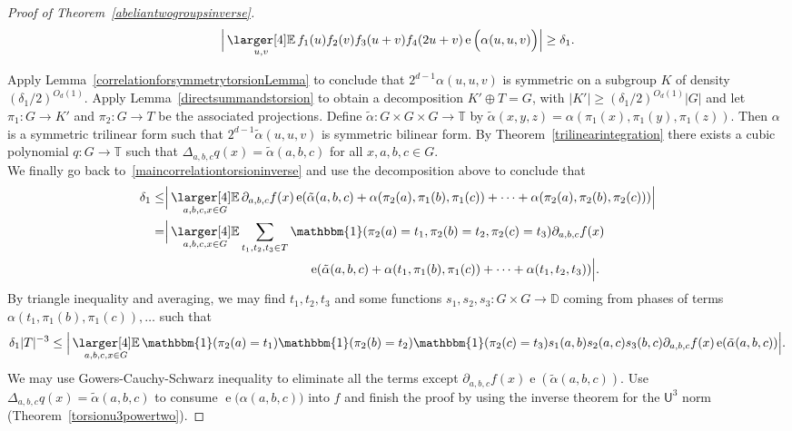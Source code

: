 \documentclass[a4paper,11pt]{article}
\numberwithin{theorem}{section}
\theoremstyle{definition}
\newcommand\id{\mathbbm{1}}
\newcommand{\on}[1]{
	\operatorname{#1}
}
\newcommand{\exx}{
  \mathop{
    \mathchoice{\vcenter{\hbox{\larger[4]$\mathbb{E}$}}}
               {\kern0pt\mathbb{E}}
               {\kern0pt\mathbb{E}}
               {\kern0pt\mathbb{E}}
  }\displaylimits
}
\begin{document}
\begin{proof}[Proof of Theorem~\ref{abeliantwogroupsinverse}]
    \begin{equation}\Big|\exx_{u , v} f_1(u) f_2(v) f_3(u + v) f_4(2u + v) \on{e}\Big(\alpha(u,u, v)\Big)\Big| \geq \delta_1.\label{firstCorrelationComplexityDecTorsion}\end{equation}

    Apply Lemma~\ref{correlationforsymmetrytorsionLemma} to conclude that $2^{d-1}\alpha(u,u, v)$ is symmetric on a subgroup $K$ of density $(\delta_1/2)^{O_d(1)}$. Apply Lemma~\ref{directsummandstorsion} to obtain a decomposition $K' \oplus T = G$, with $|K'| \geq (\delta_1/2)^{O_d(1)}|G|$ and let $\pi_1 : G \to K'$ and $\pi_2 : G \to T$ be the associated projections. Define $\tilde{\alpha} :G \times G \times G \to \mathbb{T}$ by $\tilde{\alpha}(x,y,z) = \alpha(\pi_1(x), \pi_1(y), \pi_1(z))$. Then $\alpha$ is a symmetric trilinear form such that $2^{d-1}\tilde{\alpha}(u,u,v)$ is symmetric bilinear form. By Theorem~\ref{trilinearintegration} there exists a cubic polynomial $q :G \to \mathbb{T}$ such that $\Delta_{a,b,c}q(x) = \tilde{\alpha}(a,b,c)$ for all $x,a,b,c \in G$.\\
    We finally go back to~\eqref{maincorrelationtorsioninverse} and use the decomposition above to conclude that 
    \begin{align*}\delta_1 \leq & \Big|\exx_{a,b,c,x \in G} \partial_{a,b,c} f(x) \on{e}(\tilde{\alpha}(a,b,c) + \alpha(\pi_2(a), \pi_1(b), \pi_1(c)) + \dots + \alpha(\pi_2(a), \pi_2(b), \pi_2(c)))\Big|\\
    = & \Big|\exx_{a,b,c,x \in G} \sum_{t_1, t_2, t_3 \in T} \id(\pi_2(a) = t_1, \pi_2(b) = t_2, \pi_2(c) = t_3) \partial_{a,b,c} f(x) \\
    &\hspace{4cm}\on{e}(\tilde{\alpha}(a,b,c) + \alpha(t_1, \pi_1(b), \pi_1(c)) + \dots + \alpha(t_1, t_2, t_3))\Big|.\end{align*}
    By triangle inequality and averaging, we may find $t_1, t_2, t_3$ and some functions $s_1, s_2, s_3 : G\times G  \to \mathbb{D}$ coming from phases of terms $\alpha(t_1, \pi_1(b), \pi_1(c)), \dots$ such that 
    \[\delta_1 |T|^{-3} \leq \Big|\exx_{a,b,c,x \in G} \id(\pi_2(a) = t_1) \id(\pi_2(b) = t_2) \id(\pi_2(c) = t_3) s_1(a,b) s_2(a,c) s_3(b,c) \partial_{a,b,c} f(x) \on{e}(\tilde{\alpha}(a,b,c))\Big|.\]
    We may use Gowers-Cauchy-Schwarz inequality to eliminate all the terms except $\partial_{a,b,c} f(x) \on{e}(\tilde{\alpha}(a,b,c))$. Use $\Delta_{a,b,c}q(x) = \tilde{\alpha}(a,b,c)$ to consume $\on{e}\Big(\alpha(a,b, c)\Big)$ into $f$ and finish the proof by using the inverse  theorem for the $\mathsf{U}^3$ norm (Theorem~\ref{torsionu3powertwo}).
    
\end{proof}
\end{document}
